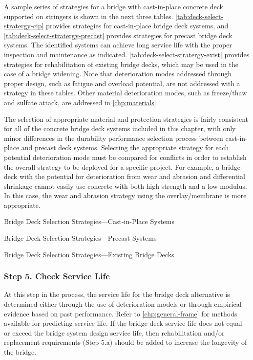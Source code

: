 A sample series of strategies for a bridge with cast-in-place concrete deck supported on stringers is shown in the next three tables. \cref{tab:deck-select-stratergy-cip} provides strategies for cast-in-place bridge deck systems, and \cref{tab:deck-select-stratergy-precast} provides strategies for precast bridge deck systems. The identified systems can achieve long service life with the proper inspection and maintenance as indicated. \cref{tab:deck-select-stratergy-exist} provides strategies for rehabilitation of existing bridge decks, which may be used in the case of a bridge widening. Note that deterioration modes addressed through proper design, such as fatigue and overload potential, are not addressed with a strategy in these tables. Other material deterioration modes, such as freeze/thaw and sulfate attack, are addressed in \cref{chp:materials}.

The selection of appropriate material and protection strategies is fairly consistent for all of the concrete bridge deck systems included in this chapter, with only minor differences in the durability performance selection process between cast-in-place and precast deck systems. Selecting the appropriate strategy for each potential deterioration mode must be compared for conflicts in order to establish the overall strategy to be deployed for a specific project. For example, a bridge deck with the potential for deterioration from wear and abrasion and differential shrinkage cannot easily use concrete with both high strength and a low modulus. In this case, the wear and abrasion strategy using the overlay/membrane is more appropriate.

\begin{table}
  \caption{Bridge Deck Selection Strategies—Cast-in-Place Systems}
  \label{tab:deck-select-stratergy-cip}
\end{table}

\begin{table}
  \caption{Bridge Deck Selection Strategies—Precast Systems}
  \label{tab:deck-select-stratergy-precast}
\end{table}

\begin{table}
  \caption{Bridge Deck Selection Strategies—Existing Bridge Decks}
  \label{tab:deck-select-stratergy-exist}
\end{table}


\subsubsection*{Step 5. Check Service Life}
At this step in the process, the service life for the bridge deck alternative is determined either through the use of deterioration models or through empirical evidence based on past performance. Refer to \cref{chp:general-frame} for methods available for predicting service life. If the bridge deck service life does not equal or exceed the bridge system design service life, then rehabilitation and/or replacement requirements (Step 5.a) should be added to increase the longevity of the bridge.

